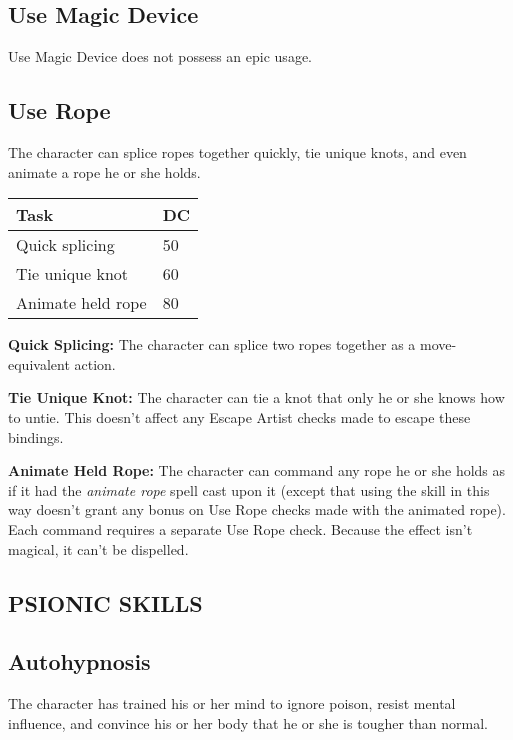 \documentclass{article}
\begin{document}
\vspace{12pt}
\subsection*{Use Magic Device }

Use Magic Device does not possess an epic usage. 

\vspace{12pt}
\subsection*{Use Rope }

The character can splice ropes together quickly, tie unique knots, and even animate 
a rope he or she holds. 

\begin{tabular}{|>{\raggedright}p{73pt}|>{\raggedright}p{13pt}|}
\hline
T\textbf{ask} & D\textbf{C }\tabularnewline
\hline
Quick splicing  & 50 \tabularnewline
\hline
Tie unique knot  & 60 \tabularnewline
\hline
Animate held rope  & 80 \tabularnewline
\hline
\end{tabular}

\textbf{Quick Splicing:}\textit{ }The character can splice two ropes together as 
a move-equivalent action. 

\textbf{Tie Unique Knot:}\textit{ }The character can tie a knot that only he or 
she knows how to untie. This doesn't affect any Escape Artist checks made to escape 
these bindings. 

\textbf{Animate Held Rope:} The character can command any rope he or she holds 
as if it had the \textit{animate rope }spell cast upon it (except that using the 
skill in this way doesn't grant any bonus on Use Rope checks made with the animated 
rope). Each command requires a separate Use Rope check. Because the effect isn't 
magical, it can't be dispelled. 

\vspace{24pt}
\subsection*{{\LARGE{}PSIONIC SKILLS}}

\vspace{12pt}
\subsection*{Autohypnosis }

The character has trained his or her mind to ignore poison, resist mental influence, 
and convince his or her body that he or she is tougher than normal. 
\end{document}
